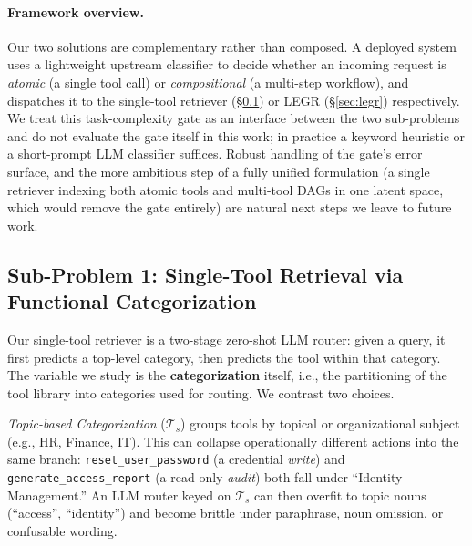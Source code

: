 \documentclass{article}
\begin{document}
\paragraph{Framework overview.} Our two solutions are complementary rather than composed. A deployed system uses a lightweight upstream classifier to decide whether an incoming request is \emph{atomic} (a single tool call) or \emph{compositional} (a multi-step workflow), and dispatches it to the single-tool retriever (\S\ref{sec:fc}) or LEGR (\S\ref{sec:legr}) respectively. We treat this task-complexity gate as an interface between the two sub-problems and do not evaluate the gate itself in this work; in practice a keyword heuristic or a short-prompt LLM classifier suffices. Robust handling of the gate's error surface, and the more ambitious step of a fully unified formulation (a single retriever indexing both atomic tools and multi-tool DAGs in one latent space, which would remove the gate entirely) are natural next steps we leave to future work.

\subsection{Sub-Problem 1: Single-Tool Retrieval via Functional Categorization}
\label{sec:fc}
Our single-tool retriever is a two-stage zero-shot LLM router: given a query, it first predicts a top-level category, then predicts the tool within that category. The variable we study is the \textbf{categorization} itself, i.e., the partitioning of the tool library into categories used for routing. We contrast two choices.

\textit{Topic-based Categorization} ($\mathcal{T}_s$) groups tools by topical or organizational subject (e.g., HR, Finance, IT). This can collapse operationally different actions into the same branch: \texttt{reset\_user\_password} (a credential \emph{write}) and \texttt{generate\_access\_report} (a read-only \emph{audit}) both fall under ``Identity Management.'' An LLM router keyed on $\mathcal{T}_s$ can then overfit to topic nouns (``access'', ``identity'') and become brittle under paraphrase, noun omission, or confusable wording.
\end{document}
